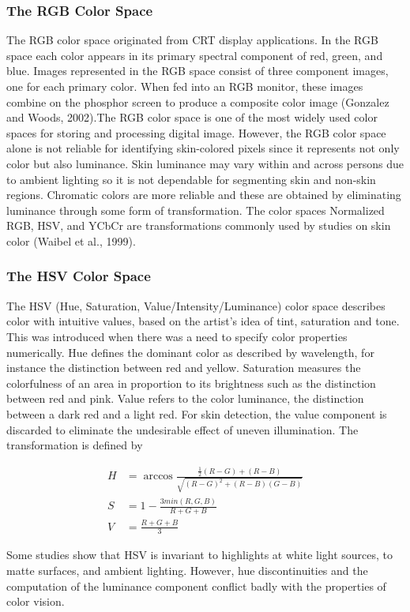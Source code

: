 \subsubsection{The RGB Color Space}
The RGB color space originated from CRT display applications.  In the RGB space each color appears in its primary spectral component of red, green, and blue.  Images represented in the RGB space consist of three component images, one for each primary color.  When fed into an RGB monitor, these images combine on the phosphor screen to produce a composite  color image (Gonzalez and Woods, 2002).The RGB color space is one of the most widely used color spaces for storing and processing digital image.  However, the RGB color space alone is not reliable for identifying skin-colored pixels since it represents not only color but also luminance.  Skin luminance may vary within and across persons due to ambient lighting so it is not dependable for segmenting skin and non-skin regions.   Chromatic colors are more reliable and these are obtained by eliminating luminance through some form of transformation.  The color spaces Normalized RGB, HSV, and YCbCr are transformations commonly used by studies on skin color (Waibel et al., 1999).


\subsubsection{The HSV Color Space}
The HSV (Hue, Saturation, Value/Intensity/Luminance) color space describes color with intuitive values, based on the artist’s idea of tint, saturation and tone.  This was introduced when there was a need to specify color properties numerically.  Hue defines the dominant color as described by wavelength, for instance the distinction between red and yellow.   Saturation measures the colorfulness of an area in proportion to its brightness such as the distinction between red and pink.   Value refers to the color luminance, the distinction between a dark red and a light  red. For skin detection, the value component is discarded to eliminate the undesirable effect of uneven illumination.  The transformation is defined by

\begin{align}
H&=\arccos\frac{\frac{1}{2} (R-G)+ (R-B)}{\sqrt{(R-G)^2 + (R-B)(G-B)}}\\
S&=1-\frac{3min(R,G,B)}{R+G+B}\\
V&=\frac{R+G+ B}{3}
\end{align}

Some studies show that HSV is invariant to highlights at white light sources, to matte surfaces, and ambient lighting. However, hue discontinuities and the computation of the luminance component conflict badly with the properties of color vision.

